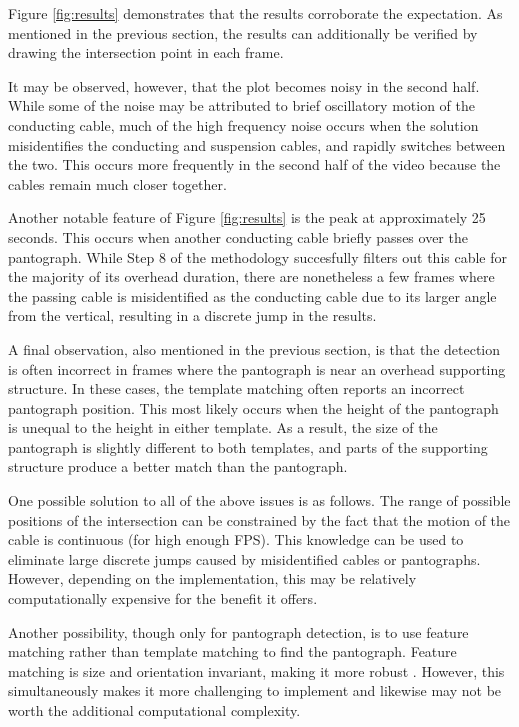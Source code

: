 Figure \ref{fig:results} demonstrates that the results corroborate the expectation. As mentioned in the previous section, the results can additionally be verified by drawing the intersection point in each frame.

It may be observed, however, that the plot becomes noisy in the second half. While some of the noise may be attributed to brief oscillatory motion of the conducting cable, much of the high frequency noise occurs when the solution misidentifies the conducting and suspension cables, and rapidly switches between the two. This occurs more frequently in the second half of the video because the cables remain much closer together.

Another notable feature of Figure \ref{fig:results} is the peak at approximately 25 seconds. This occurs when another conducting cable briefly passes over the pantograph. While Step 8 of the methodology succesfully filters out this cable for the majority of its overhead duration, there are nonetheless a few frames where the passing cable is misidentified as the conducting cable due to its larger angle from the vertical, resulting in a discrete jump in the results.

A final observation, also mentioned in the previous section, is that the detection is often incorrect in frames where the pantograph is near an overhead supporting structure. In these cases, the template matching often reports an incorrect pantograph position. This most likely occurs when the height of the pantograph is unequal to the height in either template. As a result, the size of the pantograph is slightly different to both templates, and parts of the supporting structure produce a better match than the pantograph.

One possible solution to all of the above issues is as follows. The range of possible positions of the intersection can be constrained by the fact that the motion of the cable is continuous (for high enough FPS). This knowledge can be used to eliminate large discrete jumps caused by misidentified cables or pantographs. However, depending on the implementation, this may be relatively computationally expensive for the benefit it offers.

Another possibility, though only for pantograph detection, is to use feature matching rather than template matching to find the pantograph. Feature matching is size and orientation invariant, making it more robust \cite{opencv_2023d}. However, this simultaneously makes it more challenging to implement and likewise may not be worth the additional computational complexity.

